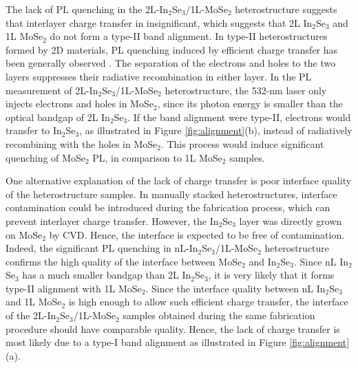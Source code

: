 \documentclass[journal=jacsat,manuscript=article]{achemso}
\begin{document}
The lack of PL quenching in the 2L-In$_2$Se$_3$/1L-MoSe$_2$ heterostructure suggests that interlayer charge transfer in insignificant, which suggests that 2L In$_2$Se$_3$ and 1L MoSe$_2$ do not form a type-II band alignment. In type-II heterostructures formed by 2D materials, PL quenching induced by efficient charge transfer has been generally observed \cite{nc66242,pnas1116198,nn9676,nl144785,nl143185,acsnano96459,nanoscale717523,acsnano106612}.  The separation of the electrons and holes to the two layers suppresses their radiative recombination in either layer. In the PL measurement of 2L-In$_2$Se$_3$/1L-MoSe$_2$ heterostructure, the 532-nm laser only injects electrons and holes in MoSe$_2$, since its photon energy is smaller than the optical bandgap of 2L In$_2$Se$_3$. If the band alignment were type-II, electrons would transfer to In$_2$Se$_3$, as illustrated in Figure \ref{fig:alignment}(b), instead of radiatively recombining with the holes in MoSe$_2$. This process would induce significant quenching of MoSe$_2$ PL, in comparison to 1L MoSe$_2$ samples.

One alternative explanation of the lack of charge transfer is poor interface quality of the heterostructure samples. In manually stacked heterostructures, interface contamination could be introduced during the fabrication process, which can prevent interlayer charge transfer. However, the In$_2$Se$_3$ layer was directly grown on MoSe$_2$ by CVD. Hence, the interface is expected to be free of contamination. Indeed, the significant PL quenching in nL-In$_2$Se$_3$/1L-MoSe$_2$ heterostructure confirms the high quality of the interface between MoSe$_2$ and In$_2$Se$_3$. Since nL In$_2$Se$_3$ has a much smaller bandgap than 2L In$_2$Se$_3$, it is very likely that it forms type-II alignment with 1L MoSe$_2$. Since the interface quality between nL In$_2$Se$_3$ and 1L MoSe$_2$ is high enough to allow such efficient charge transfer, the interface of the 2L-In$_2$Se$_3$/1L-MoSe$_2$ samples obtained during the same fabrication procedure should have comparable quality. Hence, the lack of charge transfer is most likely due to a type-I band alignment as illustrated in Figure \ref{fig:alignment}(a).
\end{document}
